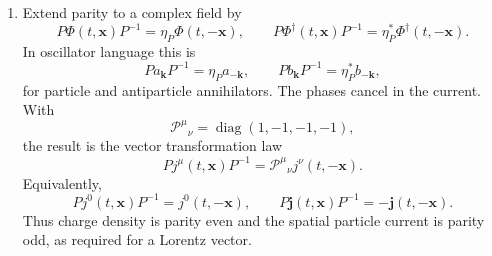 \begin{enumerate}
\begin{enumerate}
\item[(d)] Extend parity to a complex field by
\[
 P\Phi(t,\mathbf x)P^{-1}=\eta_P\Phi(t,-\mathbf x),
 \qquad
 P\Phi^\dagger(t,\mathbf x)P^{-1}
 =\eta_P^*\Phi^\dagger(t,-\mathbf x).
\]
In oscillator language this is
\[
 Pa_{\mathbf k}P^{-1}=\eta_Pa_{-\mathbf k},
 \qquad
 Pb_{\mathbf k}P^{-1}=\eta_P^*b_{-\mathbf k},
\]
for particle and antiparticle annihilators.  The phases cancel in the
current.  With
\[
 \mathcal P^\mu{}_{\nu}=\operatorname{diag}(1,-1,-1,-1),
\]
the result is the vector transformation law
\[
 \boxed{
 Pj^\mu(t,\mathbf x)P^{-1}
 =\mathcal P^\mu{}_{\nu}j^\nu(t,-\mathbf x)}.
\]
Equivalently,
\[
 Pj^0(t,\mathbf x)P^{-1}=j^0(t,-\mathbf x),
 \qquad
 P\mathbf j(t,\mathbf x)P^{-1}=-\mathbf j(t,-\mathbf x).
\]
Thus charge density is parity even and the spatial particle current is
parity odd, as required for a Lorentz vector.
\end{enumerate}
\end{enumerate}
